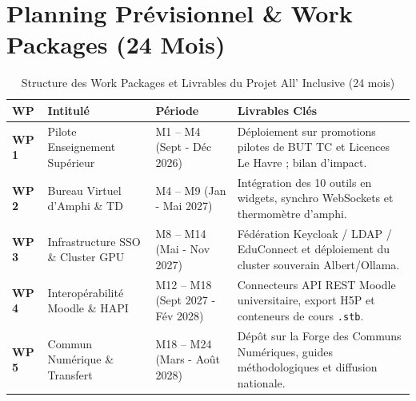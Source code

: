 \documentclass[11pt,a4paper]{article}
\begin{document}
\newpage
\section{Planning Prévisionnel \& Work Packages (24 Mois)}

\begin{table}[h!]
\centering
\small
\begin{tabularx}{\textwidth}{l p{4.2cm} p{3.2cm} X}
\toprule
\textbf{WP} & \textbf{Intitulé} & \textbf{Période} & \textbf{Livrables Clés} \\
\midrule
\textbf{WP 1} & Pilote Enseignement Supérieur & M1 -- M4 (Sept - Déc 2026) & Déploiement sur promotions pilotes de BUT TC et Licences Le Havre ; bilan d'impact. \\
\addlinespace
\textbf{WP 2} & Bureau Virtuel d'Amphi \& TD & M4 -- M9 (Jan - Mai 2027) & Intégration des 10 outils en widgets, synchro WebSockets et thermomètre d'amphi. \\
\addlinespace
\textbf{WP 3} & Infrastructure SSO \& Cluster GPU & M8 -- M14 (Mai - Nov 2027) & Fédération Keycloak / LDAP / EduConnect et déploiement du cluster souverain Albert/Ollama. \\
\addlinespace
\textbf{WP 4} & Interopérabilité Moodle \& HAPI & M12 -- M18 (Sept 2027 - Fév 2028) & Connecteurs API REST Moodle universitaire, export H5P et conteneurs de cours \texttt{.stb}. \\
\addlinespace
\textbf{WP 5} & Commun Numérique \& Transfert & M18 -- M24 (Mars - Août 2028) & Dépôt sur la Forge des Communs Numériques, guides méthodologiques et diffusion nationale. \\
\bottomrule
\end{tabularx}
\caption{Structure des Work Packages et Livrables du Projet All' Inclusive (24 mois)}
\end{table}
\vspace{0.4cm}
\end{document}
